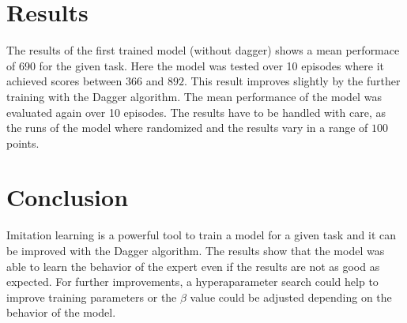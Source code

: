 \documentclass[a4paper, 9pt]{extarticle}
\begin{document}
\section*{Results}
The results of the first trained model (without dagger) shows a mean performace of 690 for the given task. 
Here the model was tested over 10 episodes where it achieved scores between $366$ and $892$.
This result improves slightly by the further training with the Dagger algorithm. The mean performance of the model was 
evaluated again over 10 episodes. The results have to be handled with care, as the runs of the model where randomized and the 
results vary in a range of $100$ points.

\section*{Conclusion}
Imitation learning is a powerful tool to train a model for a given task and it can be improved with the Dagger algorithm. 
The results show that the model was able to learn the behavior of the expert even if the results are not as good as expected. 
For further improvements, a hyperaparameter search could help to improve training parameters or the $\beta$ value 
could be adjusted depending on the behavior of the model. 
\end{document}

